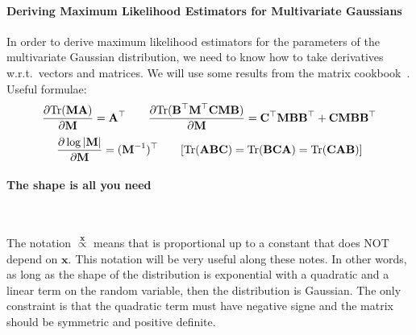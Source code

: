 \paragraph{Deriving Maximum Likelihood Estimators for Multivariate Gaussians} In order to derive maximum likelihood estimators for the parameters of the multivariate Gaussian distribution, we need to know how to take derivatives w.r.t.\ vectors and matrices. We will use some results from the matrix cookbook~\cite{matrix-cookbook}. Useful formulae:
\begin{equation}
\frac{\partial \textrm{Tr}(\boldsymbol{\mathbf{M}}\boldsymbol{\mathbf{A}})}{\partial\boldsymbol{\mathbf{M}}}=\boldsymbol{\mathbf{A}}^\top \qquad \frac{\partial \textrm{Tr}(\boldsymbol{\mathbf{B}}^\top\boldsymbol{\mathbf{M}}^\top\boldsymbol{\mathbf{C}}\boldsymbol{\mathbf{M}}\boldsymbol{\mathbf{B}})}{\partial\boldsymbol{\mathbf{M}}}=\boldsymbol{\mathbf{C}}^\top\boldsymbol{\mathbf{M}}\boldsymbol{\mathbf{B}}\boldsymbol{\mathbf{B}}^\top+\boldsymbol{\mathbf{C}}\boldsymbol{\mathbf{M}}\boldsymbol{\mathbf{B}}\boldsymbol{\mathbf{B}}^\top
\end{equation} 
\begin{equation}
\frac{\partial \log|\boldsymbol{\mathbf{M}}|}{\partial\boldsymbol{\mathbf{M}}}=(\boldsymbol{\mathbf{M}}^{-1})^\top \qquad [\textrm{Tr}(\boldsymbol{\mathbf{A}}\boldsymbol{\mathbf{B}}\boldsymbol{\mathbf{C}}) = \textrm{Tr}(\boldsymbol{\mathbf{B}}\boldsymbol{\mathbf{C}}\boldsymbol{\mathbf{A}}) = \textrm{Tr}(\boldsymbol{\mathbf{C}}\boldsymbol{\mathbf{A}}\boldsymbol{\mathbf{B}})]
\end{equation}


\paragraph{The shape is all you need} $ $\\


The notation $\stackrel{\mathbf{x}}{\propto}$ means that is proportional up to a constant that does NOT depend on $\mathbf{x}$. This notation will be very useful along these notes. In other words, as long as the shape of the distribution is exponential with a quadratic and a linear term on the random variable, then the distribution is Gaussian. The only constraint is that the quadratic term must have negative signe and the matrix should be symmetric and positive definite.\vspace{2mm}

